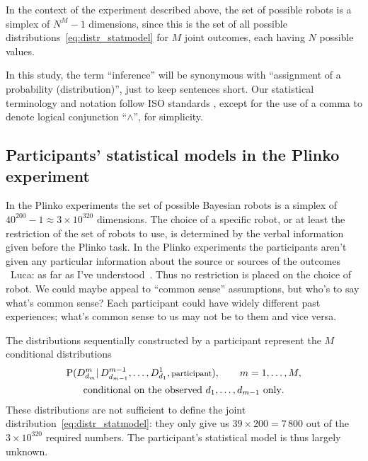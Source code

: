 \documentclass[\ifafour a4paper,12pt,\else a5paper,10pt,\fi%
onecolumn,oneside,article,%
british%
]{memoir}
\theoremstyle{remark}
\theoremstyle{innote}
\newcommand*{\citep}{\parencites}
\newcommand*{\p}{\mathrm{P}}%
\renewcommand*{\|}{\mathpunct{|}}
\newcommand*{\puzzle}{\maltese}
\newcommand{\mynote}[1]{ {\color{notecolour}\puzzle\ #1\ }}
\begin{document}
In the context of the experiment described above, the set of possible
robots is a simplex of $N^M-1$ dimensions, since this is the set of all
possible distributions~\eqref{eq:distr_statmodel} for $M$ joint outcomes,
each having $N$ possible values.

In this study, the term \enquote{inference} will be synonymous with
\enquote{assignment of a probability (distribution)}, just to keep
sentences short. Our statistical terminology and notation follow ISO
standards \citep{iso1993_r2009,iso2006}, except for the use of a comma to
denote logical conjunction \enquote{$\land$}, for simplicity.

\subsection{Participants' statistical models in the Plinko experiment}
\label{sec:plinko_statmodels}

In the Plinko experiments \citep{filipowiczetal2014,filipowiczetal2016} the
set of possible Bayesian robots is a simplex of
$40^{200}-1 \approx 3\times10^{320}$ dimensions. The choice of a specific
robot, or at least the restriction of the set of robots to use, is
determined by the verbal information given before the Plinko task. In the
Plinko experiments the participants aren't given any particular information
about the source or sources of the outcomes \mynote{Luca: as far as I've
  understood}. Thus no restriction is placed on the choice of robot. We
could maybe appeal to \enquote{common sense} assumptions, but who's to say
what's common sense? Each participant could have widely different past
experiences; what's common sense to us may not be to them and vice versa.

The distributions sequentially constructed by a participant represent the
$M$ conditional distributions
\begin{multline}
  \p(D^m_{d_m} \| D^{m-1}_{d_{m-1}},\dotsc,D^1_{d_1},
  \text{\footnotesize participant}),
  \qquad m=1,\dotsc,M,\\
  \text{conditional on the observed $d_1,\dotsc,d_{m-1}$ only}.
\label{eq:cond_distribs}
\end{multline}
These distributions are not sufficient to define the joint
distribution~\eqref{eq:distr_statmodel}: they only give us
$39\times 200=7\,800$ out of the $3\times 10^{320}$ required numbers. The
participant's statistical model is thus largely unknown.
\end{document}
